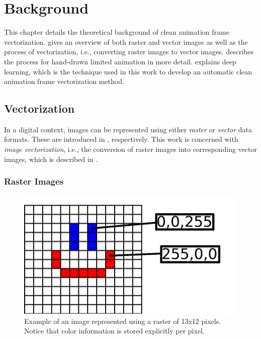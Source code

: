 \chapter{Background}
\label{ch:bg}
This chapter details the theoretical background of clean animation frame vectorization.   gives an overview of both raster and vector images as well as the process of vectorization, i.e., converting raster images to vector images.  describes the process for hand-drawn limited animation in more detail.  explains deep learning, which is the technique used in this work to develop an automatic clean animation frame vectorization method.

\section{Vectorization}
\label{sec:bg.vec}

In a digital context, images can be  represented using either \emph{raster} or \emph{vector} data formats. These are introduced in , respectively. This work is concerned with \emph{image vectorization}, i.e., the conversion of raster images into corresponding vector images, which is described in .

\subsection{Raster Images}
\label{sec:bg.vec.raster}

\begin{figure}
    \centering
    \includegraphics{graphics/raster_color_ex.png}
    \caption{Example of an image represented using a raster of 13x12 pixels. Notice that color information is stored explicitly per pixel.}
    \label{fig:raster-color-ex}
\end{figure}

